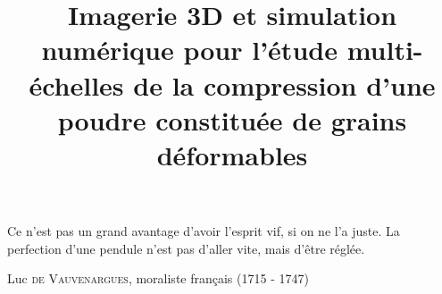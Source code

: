 \documentclass[a4paper, 12pt, openright]{book}
\title{Imagerie 3D et simulation numérique pour l'étude multi-échelles de la compression d'une poudre constituée de grains déformables}
\begin{document}
	
	\frontmatter
	
	
	\null{}
	\epigraph{Ce n'est pas un grand avantage d'avoir l'esprit vif, si on ne l'a juste. La perfection d'une pendule n'est pas d'aller vite, mais d'être réglée.}{Luc \textsc{de Vauvenargues}, moraliste français (1715 - 1747)}
	\null
	
	
	\tableofcontents
	
	\mainmatter
	
	
	
	
	
	
	
	
	
	
	\appendix
	
	
	
	
	
	
	
	
\end{document}
